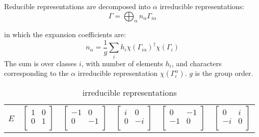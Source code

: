 \documentclass[twocolumn,showpacs,preprintnumbers,superscriptaddress,prb,floatfix,aps,10pt]{revtex4-1}
\begin{document}
Reducible representations are decomposed into $\alpha$ irreducible representations:
\begin{equation}
\label{eq:irrep_decomposition}
\Gamma = \bigoplus_\alpha n_\alpha \Gamma_{i\alpha}
\end{equation}

in which the expansion coefficients are:
\begin{equation}
\label{eq:irrep_decomposition_coefficients}
n_\alpha = \frac{1}{g} \sum_i h_i \chi\left(\Gamma_{i\alpha}\right)^\dag \chi\left(\Gamma_i\right)
\end{equation}
The sum is over classes $i$, with number of elements $h_i$, and characters corresponding to the $\alpha$ irreducible representation $\chi(\Gamma_i^\alpha)$. $g$ is the group order.



\begin{table}
\caption{\label{table:irreps} irreducible representations}
\begin{ruledtabular}
\begin{tabular*}{10cm}{lccccc}
$E$
&
$
\begin{bmatrix}
   1  &  0  \\
   0  &  1  \\
\end{bmatrix}
$
&
$
\begin{bmatrix}
  -1  &  0  \\
   0  & -1  \\
\end{bmatrix}
$
&
$
\begin{bmatrix}
   i  &  0  \\
   0  & -i  \\
\end{bmatrix}
$
&
$
\begin{bmatrix}
   0  & -1  \\
  -1  &  0  \\
\end{bmatrix}
$
&
$
\begin{bmatrix}
   0  &  i  \\
  -i  &  0  \\
\end{bmatrix}
$
\end{tabular*}
\end{ruledtabular}
\end{table}

%
%
%
\end{document}
